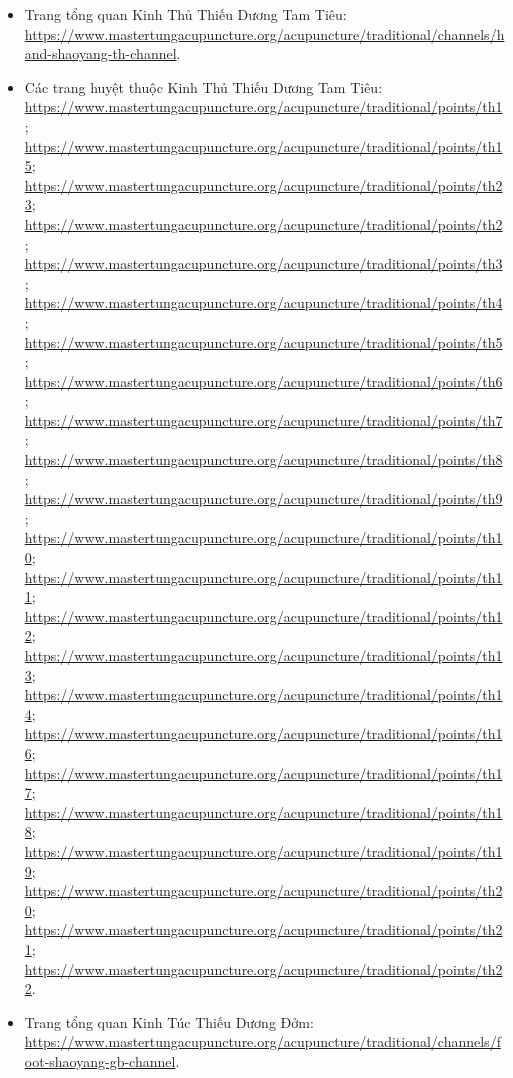 \documentclass[12pt,a4paper]{article}
\begin{document}
\begin{itemize}
  \item Trang tổng quan Kinh Thủ Thiếu Dương Tam Tiêu: \url{https://www.mastertungacupuncture.org/acupuncture/traditional/channels/hand-shaoyang-th-channel}.
  \item Các trang huyệt thuộc Kinh Thủ Thiếu Dương Tam Tiêu: \url{https://www.mastertungacupuncture.org/acupuncture/traditional/points/th1}; \url{https://www.mastertungacupuncture.org/acupuncture/traditional/points/th15}; \url{https://www.mastertungacupuncture.org/acupuncture/traditional/points/th23}; \url{https://www.mastertungacupuncture.org/acupuncture/traditional/points/th2}; \url{https://www.mastertungacupuncture.org/acupuncture/traditional/points/th3}; \url{https://www.mastertungacupuncture.org/acupuncture/traditional/points/th4}; \url{https://www.mastertungacupuncture.org/acupuncture/traditional/points/th5}; \url{https://www.mastertungacupuncture.org/acupuncture/traditional/points/th6}; \url{https://www.mastertungacupuncture.org/acupuncture/traditional/points/th7}; \url{https://www.mastertungacupuncture.org/acupuncture/traditional/points/th8}; \url{https://www.mastertungacupuncture.org/acupuncture/traditional/points/th9}; \url{https://www.mastertungacupuncture.org/acupuncture/traditional/points/th10}; \url{https://www.mastertungacupuncture.org/acupuncture/traditional/points/th11}; \url{https://www.mastertungacupuncture.org/acupuncture/traditional/points/th12}; \url{https://www.mastertungacupuncture.org/acupuncture/traditional/points/th13}; \url{https://www.mastertungacupuncture.org/acupuncture/traditional/points/th14}; \url{https://www.mastertungacupuncture.org/acupuncture/traditional/points/th16}; \url{https://www.mastertungacupuncture.org/acupuncture/traditional/points/th17}; \url{https://www.mastertungacupuncture.org/acupuncture/traditional/points/th18}; \url{https://www.mastertungacupuncture.org/acupuncture/traditional/points/th19}; \url{https://www.mastertungacupuncture.org/acupuncture/traditional/points/th20}; \url{https://www.mastertungacupuncture.org/acupuncture/traditional/points/th21}; \url{https://www.mastertungacupuncture.org/acupuncture/traditional/points/th22}.
  \item Trang tổng quan Kinh Túc Thiếu Dương Đởm: \url{https://www.mastertungacupuncture.org/acupuncture/traditional/channels/foot-shaoyang-gb-channel}.

\end{itemize}
\end{document}
